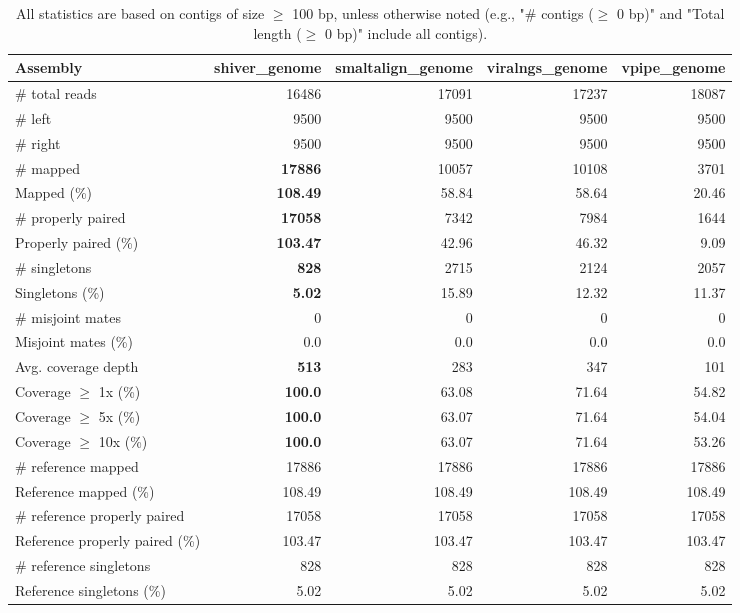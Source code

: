 \documentclass[12pt,a4paper]{article}
\begin{document}
\begin{table}[ht]
\begin{center}
\caption{All statistics are based on contigs of size $\geq$ 100 bp, unless otherwise noted (e.g., "\# contigs ($\geq$ 0 bp)" and "Total length ($\geq$ 0 bp)" include all contigs).}
\begin{tabular}{|l*{4}{|r}|}
\hline
Assembly & shiver\_genome & smaltalign\_genome & viralngs\_genome & vpipe\_genome \\ \hline
\# total reads & 16486 & 17091 & 17237 & 18087 \\ \hline
\# left & 9500 & 9500 & 9500 & 9500 \\ \hline
\# right & 9500 & 9500 & 9500 & 9500 \\ \hline
\# mapped & {\bf 17886} & 10057 & 10108 & 3701 \\ \hline
Mapped (\%) & {\bf 108.49} & 58.84 & 58.64 & 20.46 \\ \hline
\# properly paired & {\bf 17058} & 7342 & 7984 & 1644 \\ \hline
Properly paired (\%) & {\bf 103.47} & 42.96 & 46.32 & 9.09 \\ \hline
\# singletons & {\bf 828} & 2715 & 2124 & 2057 \\ \hline
Singletons (\%) & {\bf 5.02} & 15.89 & 12.32 & 11.37 \\ \hline
\# misjoint mates & 0 & 0 & 0 & 0 \\ \hline
Misjoint mates (\%) & 0.0 & 0.0 & 0.0 & 0.0 \\ \hline
Avg. coverage depth & {\bf 513} & 283 & 347 & 101 \\ \hline
Coverage $\geq$ 1x (\%) & {\bf 100.0} & 63.08 & 71.64 & 54.82 \\ \hline
Coverage $\geq$ 5x (\%) & {\bf 100.0} & 63.07 & 71.64 & 54.04 \\ \hline
Coverage $\geq$ 10x (\%) & {\bf 100.0} & 63.07 & 71.64 & 53.26 \\ \hline
\# reference mapped & 17886 & 17886 & 17886 & 17886 \\ \hline
Reference mapped (\%) & 108.49 & 108.49 & 108.49 & 108.49 \\ \hline
\# reference properly paired & 17058 & 17058 & 17058 & 17058 \\ \hline
Reference properly paired (\%) & 103.47 & 103.47 & 103.47 & 103.47 \\ \hline
\# reference singletons & 828 & 828 & 828 & 828 \\ \hline
Reference singletons (\%) & 5.02 & 5.02 & 5.02 & 5.02 \\ \hline

\end{tabular}
\end{center}
\end{table}
\end{document}
